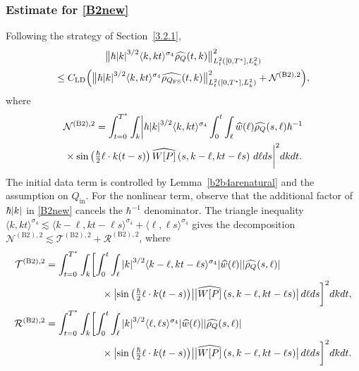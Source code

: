 \documentclass[JEP,XML,SOM,Unicode]{cedram}
\newcommand{\bnorm}[1]{\bigl\|#1\bigr\|}
\newcommand{\babs}[1]{\bigl|#1\bigr|}
\theoremstyle{plain}
\theoremstyle{remark}
\newcommand{\br}[1]{\left(#1\right)}
\newcommand{\Bbr}[1]{\Bigl(#1 \Bigr)}
\newcommand{\ak}{\abs{k}}
\newcommand{\jb}[1]{\langle#1\rangle}
\newcommand{\mytextfrac}[2]{{\textstyle\frac{#1}{#2}}}
\newcommand{\Qin}{Q_{\mathrm{in}}}
\begin{document}
\subsubsection{Estimate for \eqref{B2new}}
Following the strategy of Section~\ref{3.2.1},
\begin{multline*}
\bnorm{\hbar\ak^{3/2}\jb{k,kt}^{\sigma_4}\widehat{\rho_Q}(t,k)}_{L^2_{t}([0,T^*],L^2_k)}^2\\
\leq C_{\mathrm{LD}}\Bbr{\bnorm{\hbar\ak^{3/2}\jb{k,kt}^{\sigma_4}\widehat{\rho_{{Q_{\mathrm{FS}}}}}(t,k)}_{L^2_{t}([0,T^*],L^2_k)}^2+\mathcal {N}^{\mathrm{(B2),2}}},
\end{multline*}
where
\begin{multline*}
\mathcal {N}^{\mathrm{(B2),2}}=\int_{t=0}^{T^*}\int_k\biggl|\hbar\ak^{3/2}\jb{k,kt}^{\sigma_4}\int_0^t\int_\ell\widehat w(\ell)\widehat{\rho_Q}(s,\ell) \hbar^{-1}\\
{}\times\sin\br{\mytextfrac{\hbar}{2}\ell\cdot k(t-s)}\widehat {W[P]}\br{s,k-\ell,kt-\ell s}\,d\ell ds\biggr|^2dkdt.
\end{multline*}
The initial data term is controlled by Lemma~\ref{b2b4arenatural} and the assumption on $\Qin$. For the nonlinear term, observe that the additional factor of $\hbar\ak$ in \eqref{B2new} cancels the $\hbar^{-1}$ denominator. The triangle inequality $\jb{k,kt}^{\sigma_4}\lesssim \jb{k-\ell,kt-\ell s}^{\sigma_4}+\jb{\ell,\ell s}^{\sigma_4}$ gives the decomposition $\mathcal{N}^{\mathrm{(B2),2}}\lesssim \mathcal{T}^{\mathrm{(B2),2}}+\mathcal{R}^{\mathrm{(B2),2}}$, where
\begin{align*}
\mathcal {T}^{\mathrm{(B2),2}}&=\int_{t=0}^{T^*}\int_k\biggl[\int_0^t\int_\ell\ak^{3/2}\jb{k-\ell,kt-\ell s}^{\sigma_4}\abs{\widehat w(\ell)}\abs{\widehat{\rho_Q}(s,\ell)}\\
&\hspace{2cm}\times\abs{\sin\br{\mytextfrac{\hbar}{2}\ell\cdot k(t-s)}}\babs{\widehat {W[P]}\br{s,k-\ell,kt-\ell s}}\,d\ell ds\biggr]^2dkdt,\\
\mathcal {R}^{\mathrm{(B2),2}}&=\int_{t=0}^{T^*}\int_k\biggl[\int_0^t\int_\ell\ak^{3/2}\jb{\ell,\ell s}^{\sigma_4}\abs{\widehat w(\ell)}\abs{\widehat{\rho_Q}(s,\ell)} \\
&\hspace{2cm}\times\abs{\sin\br{\mytextfrac{\hbar}{2}\ell\cdot k(t-s)}}\babs{\widehat {W[P]}\br{s,k-\ell,kt-\ell s}}\,d\ell ds\biggr]^2dkdt.
\end{align*}
\end{document}
